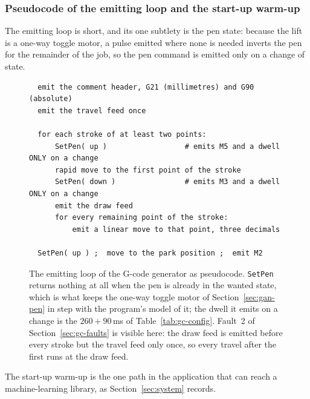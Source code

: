 \subsubsection{Pseudocode of the emitting loop and the start-up warm-up}

The emitting loop is short, and its one subtlety is the pen state: because the lift is a one-way toggle motor, a pulse emitted where none is needed inverts the pen for the remainder of the job, so the pen command is emitted only on a change of state.

\begin{figure}[!htbp]
\centering
\fontsize{8.5}{10.2}\selectfont
\begin{verbatim}
  emit the comment header, G21 (millimetres) and G90 (absolute)
  emit the travel feed once

  for each stroke of at least two points:
      SetPen( up )                  # emits M5 and a dwell ONLY on a change
      rapid move to the first point of the stroke
      SetPen( down )                # emits M3 and a dwell ONLY on a change
      emit the draw feed
      for every remaining point of the stroke:
          emit a linear move to that point, three decimals

  SetPen( up ) ;  move to the park position ;  emit M2
\end{verbatim}
\caption{The emitting loop of the G-code generator as pseudocode. \texttt{SetPen} returns nothing at all when the pen is already in the wanted state, which is what keeps the one-way toggle motor of Section~\ref{sec:gan-pen} in step with the program's model of it; the dwell it emits on a change is the $260+90$\,ms of Table~\ref{tab:gc-config}. Fault~2 of Section~\ref{sec:gc-faults} is visible here: the draw feed is emitted before every stroke but the travel feed only once, so every travel after the first runs at the draw feed.}
\label{fig:gc-emitpseudo}
\end{figure}

The start-up warm-up is the one path in the application that can reach a machine-learning library, as Section~\ref{sec:system} records.

